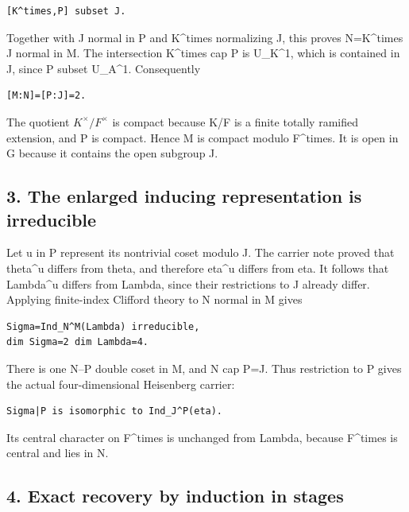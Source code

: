 \begin{Verbatim}[fontsize=\small,breaklines=true,breakanywhere=true]
[K^times,P] subset J.
\end{Verbatim}

Together with J normal in P and K\^{}times normalizing J, this proves
N=K\^{}times J normal in M. The intersection K\^{}times cap P is
U\_K\^{}1, which is contained in J, since P subset U\_A\^{}1.
Consequently

\begin{Verbatim}[fontsize=\small,breaklines=true,breakanywhere=true]
[M:N]=[P:J]=2.
\end{Verbatim}

The quotient \(K^\times/F^\times\) is compact because K/F is a
finite totally ramified extension, and P is compact. Hence M is compact
modulo F\^{}times. It is open in G because it contains the open subgroup
J.

\hypertarget{rank~4_stages-the-enlarged-inducing-representation-is-irreducible}{%
\subsection{3. The enlarged inducing representation is
irreducible}\label{rank~4_stages-the-enlarged-inducing-representation-is-irreducible}}

Let u in P represent its nontrivial coset modulo J. The carrier note
proved that theta\^{}u differs from theta, and therefore eta\^{}u
differs from eta. It follows that Lambda\^{}u differs from Lambda, since
their restrictions to J already differ. Applying finite-index Clifford
theory to N normal in M gives

\begin{Verbatim}[fontsize=\small,breaklines=true,breakanywhere=true]
Sigma=Ind_N^M(Lambda) irreducible,
dim Sigma=2 dim Lambda=4.
\end{Verbatim}

There is one N--P double coset in M, and N cap P=J. Thus restriction to
P gives the actual four-dimensional Heisenberg carrier:

\begin{Verbatim}[fontsize=\small,breaklines=true,breakanywhere=true]
Sigma|P is isomorphic to Ind_J^P(eta).
\end{Verbatim}

Its central character on F\^{}times is unchanged from Lambda, because
F\^{}times is central and lies in N.

\hypertarget{rank~4_stages-exact-recovery-by-induction-in-stages}{%
\subsection{4. Exact recovery by induction in
stages}\label{rank~4_stages-exact-recovery-by-induction-in-stages}}

